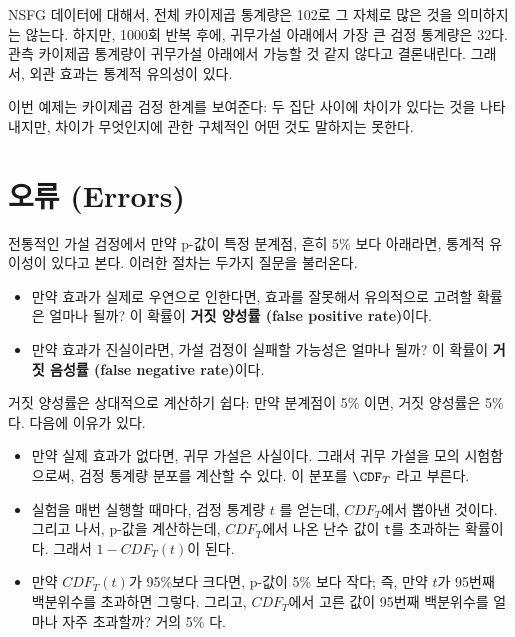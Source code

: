 NSFG 데이터에 대해서, 전체 카이제곱 통계량은 102로 그 자체로 많은 것을 의미하지는 않는다. 하지만, 1000회 반복 후에, 귀무가설 아래에서 가장 큰 검정 통계량은 32다. 관측 카이제곱 통계량이 귀무가설 아래에서 가능할 것 같지 않다고 결론내린다. 그래서, 외관 효과는 통계적 유의성이 있다.


이번 예제는 카이제곱 검정 한계를 보여준다: 두 집단 사이에 차이가 있다는 것을 나타내지만, 차이가 무엇인지에 관한 구체적인 어떤 것도 말하지는 못한다.

\section{오류 (Errors)}

전통적인 가설 검정에서 만약 p-값이 특정 분계점, 흔히 5\% 보다 아래라면, 통계적 유이성이 있다고 본다. 이러한 절차는 두가지 질문을 불러온다.

\begin{itemize}

\item 만약 효과가 실제로 우연으로 인한다면, 효과를 잘못해서 유의적으로 고려할 확률은 얼마나 될까? 이 확률이 {\bf 거짓 양성률 (false positive rate)}이다.

\item 만약 효과가 진실이라면, 가설 검정이 실패할 가능성은 얼마나 될까?
이 확률이 {\bf 거짓 음성률 (false negative rate)}이다.

\end{itemize}

거짓 양성률은 상대적으로 계산하기 쉽다: 만약 분계점이 5\% 이면, 거짓 양성률은 5\% 다. 다음에 이유가 있다.

\begin{itemize}

\item 만약 실제 효과가 없다면, 귀무 가설은 사실이다. 그래서 귀무 가설을 모의 시험함으로써, 검정 통계량 분포를 계산할 수 있다. 이 분포를 $\CDF_T$ 라고 부른다.

\item 실험을 매번 실행할 때마다, 검정 통계량 $t$ 를 얻는데, $CDF_T$에서 뽑아낸 것이다. 그리고 나서, p-값을 계산하는데, $CDF_T$에서 나온 난수 값이 {\tt t}를 초과하는 확률이다. 그래서 $1 - CDF_T(t)$이 된다.

\item 만약 $CDF_T(t)$가 95\%보다 크다면, p-값이 5\% 보다 작다; 즉, 만약 $t$가 95번째 백분위수를 초과하면 그렇다. 그리고, $CDF_T$에서 고른 값이 95번째 백분위수를 얼마나 자주 초과할까? 거의 5\% 다.

\end{itemize}

